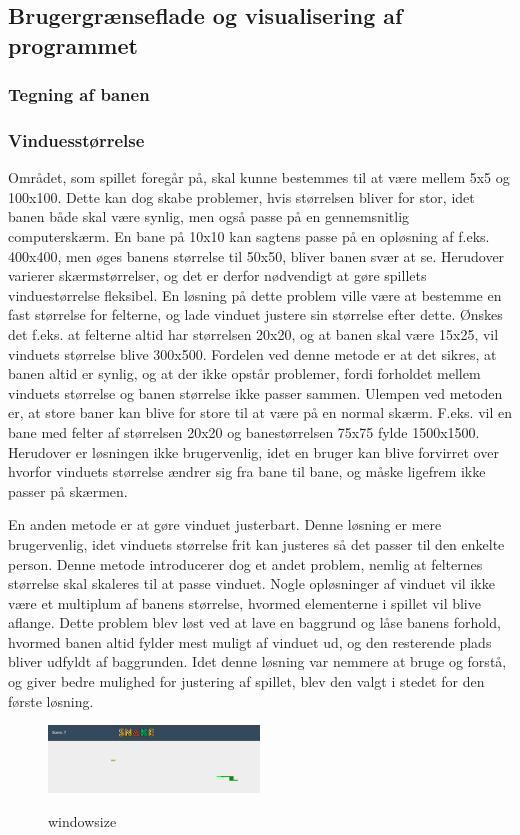 \documentclass{report}
\begin{document}
\subsection{Brugergrænseflade og visualisering af programmet}
\subsubsection{Tegning af banen}


\subsubsection{Vinduesstørrelse}
Området, som spillet foregår på, skal kunne bestemmes til at være mellem 5x5 og 100x100. Dette kan dog skabe problemer, hvis størrelsen bliver for stor, idet banen både skal være synlig, men også passe på en gennemsnitlig computerskærm. En bane på 10x10 kan sagtens passe på en opløsning af f.eks. 400x400, men øges banens størrelse til 50x50, bliver banen svær at se. Herudover varierer skærmstørrelser, og det er derfor nødvendigt at gøre spillets vinduestørrelse fleksibel. En løsning på dette problem ville være at bestemme en fast størrelse for felterne, og lade vinduet justere sin størrelse efter dette. Ønskes det f.eks. at felterne altid har størrelsen 20x20, og at banen skal være 15x25, vil vinduets størrelse blive 300x500. Fordelen ved denne metode er at det sikres, at banen altid er synlig, og at der ikke opstår problemer, fordi forholdet mellem vinduets størrelse og banen størrelse ikke passer sammen. Ulempen ved metoden er, at store baner kan blive for store til at være på en normal skærm. F.eks. vil en bane med felter af størrelsen 20x20 og banestørrelsen 75x75 fylde 1500x1500. Herudover er løsningen ikke brugervenlig, idet en bruger kan blive forvirret over hvorfor vinduets størrelse ændrer sig fra bane til bane, og måske ligefrem ikke passer på skærmen.

En anden metode er at gøre vinduet justerbart. Denne løsning er mere brugervenlig, idet vinduets størrelse frit kan justeres så det passer til den enkelte person. Denne metode introducerer dog et andet problem, nemlig at felternes størrelse skal skaleres til at passe vinduet. Nogle opløsninger af vinduet vil ikke være et multiplum af banens størrelse, hvormed elementerne i spillet vil blive aflange. Dette problem blev løst ved at lave en baggrund og låse banens forhold, hvormed banen altid fylder mest muligt af vinduet ud, og den resterende plads bliver udfyldt af baggrunden. Idet denne løsning var nemmere at bruge og forstå, og giver bedre mulighed for justering af spillet, blev den valgt i stedet for den første løsning.
\begin{figure}[h]
	\centering
	\graphicspath{ {pics/} }
	\includegraphics[width=0.5\textwidth]{WindowSize.png}
	\label{fig:windowsize}
	\caption{windowsize}
\end{figure}
\end{document}
